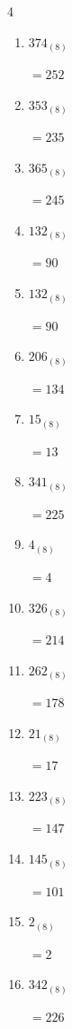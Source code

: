\begin{multicols}{4}
\begin{enumerate}
        $=32$

  \item $374_{(8)}$

        $=252$

  \item $353_{(8)}$

        $=235$

  \item $365_{(8)}$

        $=245$

  \item $132_{(8)}$

        $=90$

  \item $132_{(8)}$

        $=90$

  \item $206_{(8)}$

        $=134$

  \item $15_{(8)}$

        $=13$

  \item $341_{(8)}$

        $=225$

  \item $4_{(8)}$

        $=4$

\columnbreak %

  \item $326_{(8)}$

        $=214$

  \item $262_{(8)}$

        $=178$

  \item $21_{(8)}$

        $=17$

  \item $223_{(8)}$

        $=147$

  \item $145_{(8)}$

        $=101$

  \item $2_{(8)}$

        $=2$

  \item $342_{(8)}$

        $=226$


\end{enumerate}
\end{multicols}
